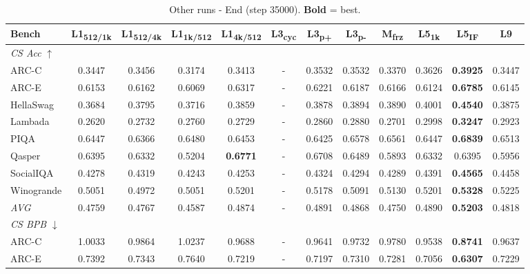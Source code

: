 \begin{table}[htbp]
\centering
\setlength{\tabcolsep}{2.5pt}
\small
\caption{Other runs - End (step 35000). \textbf{Bold} = best.}
\label{tab:other_end}
\begin{tabular}{lccccccccccc}
\toprule
Bench & L1\textsubscript{512/1k} & L1\textsubscript{512/4k} & L1\textsubscript{1k/512} & L1\textsubscript{4k/512} & L3\textsubscript{cyc} & L3\textsubscript{p+} & L3\textsubscript{p-} & M\textsubscript{frz} & L5\textsubscript{1k} & L5\textsubscript{IF} & L9 \\
\midrule
\multicolumn{12}{l}{\textit{CS Acc} $\uparrow$} \\
ARC-C & 0.3447 & 0.3456 & 0.3174 & 0.3413 & - & 0.3532 & 0.3532 & 0.3370 & 0.3626 & \textbf{0.3925} & 0.3447 \\
ARC-E & 0.6153 & 0.6162 & 0.6069 & 0.6317 & - & 0.6221 & 0.6187 & 0.6166 & 0.6124 & \textbf{0.6785} & 0.6145 \\
HellaSwag & 0.3684 & 0.3795 & 0.3716 & 0.3859 & - & 0.3878 & 0.3894 & 0.3890 & 0.4001 & \textbf{0.4540} & 0.3875 \\
Lambada & 0.2620 & 0.2732 & 0.2760 & 0.2729 & - & 0.2860 & 0.2880 & 0.2701 & 0.2998 & \textbf{0.3247} & 0.2923 \\
PIQA & 0.6447 & 0.6366 & 0.6480 & 0.6453 & - & 0.6425 & 0.6578 & 0.6561 & 0.6447 & \textbf{0.6839} & 0.6513 \\
Qasper & 0.6395 & 0.6332 & 0.5204 & \textbf{0.6771} & - & 0.6708 & 0.6489 & 0.5893 & 0.6332 & 0.6395 & 0.5956 \\
SocialIQA & 0.4278 & 0.4319 & 0.4243 & 0.4253 & - & 0.4324 & 0.4294 & 0.4289 & 0.4391 & \textbf{0.4565} & 0.4458 \\
Winogrande & 0.5051 & 0.4972 & 0.5051 & 0.5201 & - & 0.5178 & 0.5091 & 0.5130 & 0.5201 & \textbf{0.5328} & 0.5225 \\
\textit{AVG} & 0.4759 & 0.4767 & 0.4587 & 0.4874 & - & 0.4891 & 0.4868 & 0.4750 & 0.4890 & \textbf{0.5203} & 0.4818 \\
\midrule
\multicolumn{12}{l}{\textit{CS BPB} $\downarrow$} \\
ARC-C & 1.0033 & 0.9864 & 1.0237 & 0.9688 & - & 0.9641 & 0.9732 & 0.9780 & 0.9538 & \textbf{0.8741} & 0.9637 \\
ARC-E & 0.7392 & 0.7343 & 0.7640 & 0.7219 & - & 0.7197 & 0.7310 & 0.7281 & 0.7056 & \textbf{0.6307} & 0.7229 \\

\end{tabular}
\end{table}
